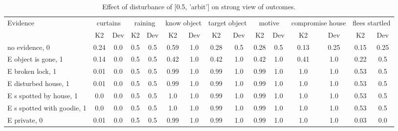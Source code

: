 \begin{table}\begin{tabular}{l|cc|cc|cc|cc|cc|cc|cc}\toprule\multirow{2}{*}{Evidence} & \multicolumn{2}{c}{curtains}& \multicolumn{2}{c}{raining}& \multicolumn{2}{c}{know object}& \multicolumn{2}{c}{target object}& \multicolumn{2}{c}{motive}& \multicolumn{2}{c}{compromise house}& \multicolumn{2}{c}{flees startled}\\& {K2} & {Dev}& {K2} & {Dev}& {K2} & {Dev}& {K2} & {Dev}& {K2} & {Dev}& {K2} & {Dev}& {K2} & {Dev}\\\midrule
no evidence, 0 & \cellcolor{Bittersweet}0.24&\cellcolor{Bittersweet}0.0&0.5&0.5&\cellcolor{Bittersweet}0.59&\cellcolor{Bittersweet}1.0&\cellcolor{Bittersweet}0.28&\cellcolor{Bittersweet}0.5&\cellcolor{Bittersweet}0.28&\cellcolor{Bittersweet}0.5&\cellcolor{Bittersweet}0.13&\cellcolor{Bittersweet}0.25&\cellcolor{Bittersweet}0.15&\cellcolor{Bittersweet}0.25\\E object is gone, 1 & \cellcolor{Bittersweet}0.14&\cellcolor{Bittersweet}0.0&0.5&0.5&\cellcolor{Bittersweet}0.42&\cellcolor{Bittersweet}1.0&\cellcolor{Bittersweet}0.42&\cellcolor{Bittersweet}1.0&\cellcolor{Bittersweet}0.42&\cellcolor{Bittersweet}1.0&\cellcolor{Bittersweet}0.41&\cellcolor{Bittersweet}1.0&\cellcolor{Bittersweet}0.22&\cellcolor{Bittersweet}0.5\\E broken lock, 1 & 0.01&0.0&0.5&0.5&0.99&1.0&0.99&1.0&0.99&1.0&1.0&1.0&0.53&0.5\\E disturbed house, 1 & 0.01&0.0&0.5&0.5&0.99&1.0&0.99&1.0&0.99&1.0&1.0&1.0&0.53&0.5\\E s spotted by house, 1 & 0.0&0.0&0.5&0.5&1.0&1.0&0.99&1.0&0.99&1.0&1.0&1.0&0.53&0.5\\E s spotted with goodie, 1 & 0.0&0.0&0.5&0.5&1.0&1.0&0.99&1.0&0.99&1.0&1.0&1.0&0.53&0.5\\E private, 0 & 0.01&0.0&0.5&0.5&0.99&1.0&0.99&1.0&0.99&1.0&1.0&1.0&0.03&0.0\\\bottomrule\end{tabular}\caption{Effect of disturbance of [0.5, 'arbit'] on strong view of outcomes.}\end{table}